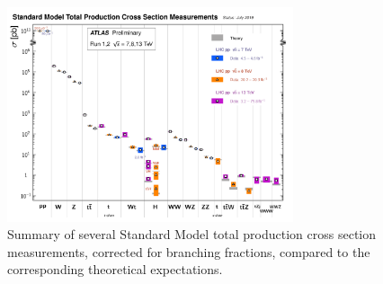 \begin{figure}[!htb]
    \begin{center}
        \includegraphics[width=0.75\textwidth]{figures/chapter1/sm_final/sm_xsec_summary}
        \caption{
            Summary of several Standard Model total production cross section measurements,
            corrected for branching fractions, compared to the corresponding theoretical expectations. 
        }
        \label{fig:sm_xsec_summary}
    \end{center}
\end{figure}
